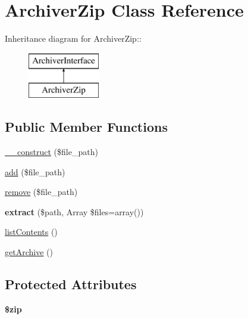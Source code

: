 \hypertarget{classArchiverZip}{
\section{ArchiverZip Class Reference}
\label{classArchiverZip}
}
Inheritance diagram for ArchiverZip::\begin{figure}[H]
\begin{center}
\leavevmode
\includegraphics[height=2cm]{classArchiverZip}
\end{center}
\end{figure}
\subsection*{Public Member Functions}
\begin{DoxyCompactItemize}
\item 
\hyperlink{classArchiverZip_adfe750d331bb6910529f1326bdab2947}{\_\-\_\-construct} (\$file\_\-path)
\item 
\hyperlink{classArchiverZip_a9f16632d5096932af9b0483f678c192c}{add} (\$file\_\-path)
\item 
\hyperlink{classArchiverZip_af19c19d199c96acfd65a08ccfb7ea406}{remove} (\$file\_\-path)
\item 
\hypertarget{classArchiverZip_a38fb28ed17d8f7cdd8fd320cde095ffa}{
{\bfseries extract} (\$path, Array \$files=array())}
\label{classArchiverZip_a38fb28ed17d8f7cdd8fd320cde095ffa}

\item 
\hyperlink{classArchiverZip_ad4d1065b4609b607195c87d432f440f7}{listContents} ()
\item 
\hyperlink{classArchiverZip_af7d03221d37135adda736c7364610fc4}{getArchive} ()
\end{DoxyCompactItemize}
\subsection*{Protected Attributes}
\begin{DoxyCompactItemize}
\item 
\hypertarget{classArchiverZip_aaec6e31f0c0de43f740edaf2c534b649}{
{\bfseries \$zip}}
\label{classArchiverZip_aaec6e31f0c0de43f740edaf2c534b649}

\end{DoxyCompactItemize}


